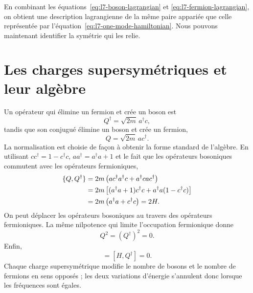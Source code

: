 En combinant les équations~\eqref{eq:l7-boson-lagrangian} et \eqref{eq:l7-fermion-lagrangian}, on obtient une description lagrangienne de la même paire appariée que celle représentée par l’équation~\eqref{eq:l7-one-mode-hamiltonian}. Nous pouvons maintenant identifier la symétrie qui les relie.

\section{Les charges supersymétriques et leur algèbre}

Un opérateur qui élimine un fermion et crée un boson est
\begin{equation}
Q^\dagger=\sqrt{2m}\,a^\dagger c,
\end{equation}
tandis que son conjugué élimine un boson et crée un fermion,
\begin{equation}
Q=\sqrt{2m}\,a c^\dagger.
\end{equation}
La normalisation est choisie de façon à obtenir la forme standard de l’algèbre. En utilisant \(cc^\dagger=1-c^\dagger c\), \(aa^\dagger=a^\dagger a+1\) et le fait que les opérateurs bosoniques commutent avec les opérateurs fermioniques,
\begin{align}
\{Q,Q^\dagger\}
&=2m\left(ac^\dagger a^\dagger c+a^\dagger c a c^\dagger\right)\notag\\
&=2m\left[(a^\dagger a+1)c^\dagger c
+a^\dagger a(1-c^\dagger c)\right]\notag\\
&=2m\left(a^\dagger a+c^\dagger c\right)=2H.
\label{eq:l7-superalgebra}
\end{align}
On peut déplacer les opérateurs bosoniques au travers des opérateurs fermioniques. La même nilpotence qui limite l’occupation fermionique donne
\begin{equation}
Q^2=(Q^\dagger)^2=0.
\end{equation}
Enfin,
\begin{equation}
[H,Q]=[H,Q^\dagger]=0.
\label{eq:l7-conserved-supercharges}
\end{equation}
Chaque charge supersymétrique modifie le nombre de bosons et le nombre de fermions en sens opposés ; les deux variations d’énergie s’annulent donc lorsque les fréquences sont égales.

\begin{classroomqa}
\end{classroomqa}


